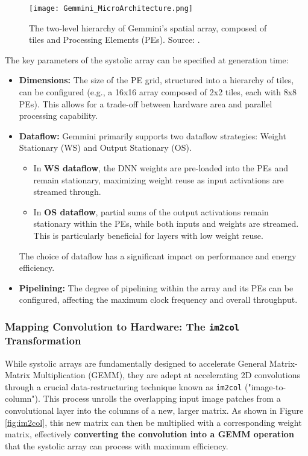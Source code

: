 \begin{figure}[htbp]
    \centering
    \texttt{[image: Gemmini\_MicroArchitecture.png]}
    \caption[Microarchitecture of Gemmini's Spatial Array]{The two-level hierarchy of Gemmini's spatial array, composed of tiles and Processing Elements (PEs). Source: \cite{gemini-dac}.}
    \label{fig:gemmini_microarch}
\end{figure}

The key parameters of the systolic array can be specified at generation time:
\begin{itemize}
    \item \textbf{Dimensions:} The size of the PE grid, structured into a hierarchy of tiles, can be configured (e.g., a 16x16 array composed of 2x2 tiles, each with 8x8 PEs). This allows for a trade-off between hardware area and parallel processing capability.
    \item \textbf{Dataflow:} Gemmini primarily supports two dataflow strategies: Weight Stationary (WS) and Output Stationary (OS). 
    \begin{itemize}
        \item In \textbf{WS dataflow}, the DNN weights are pre-loaded into the PEs and remain stationary, maximizing weight reuse as input activations are streamed through. 
        \item In \textbf{OS dataflow}, partial sums of the output activations remain stationary within the PEs, while both inputs and weights are streamed. This is particularly beneficial for layers with low weight reuse.
    \end{itemize}
    The choice of dataflow has a significant impact on performance and energy efficiency.
    \item \textbf{Pipelining:} The degree of pipelining within the array and its PEs can be configured, affecting the maximum clock frequency and overall throughput.
\end{itemize}

\subsubsection{Mapping Convolution to Hardware: The \texttt{im2col} Transformation}
\label{subsubsec:im2col}
While systolic arrays are fundamentally designed to accelerate General Matrix-Matrix Multiplication (GEMM), they are adept at accelerating 2D convolutions through a crucial data-restructuring technique known as \texttt{im2col} ("image-to-column"). This process unrolls the overlapping input image patches from a convolutional layer into the columns of a new, larger matrix. As shown in Figure \ref{fig:im2col}, this new matrix can then be multiplied with a corresponding weight matrix, effectively \textbf{converting the convolution into a GEMM operation} that the systolic array can process with maximum efficiency.

